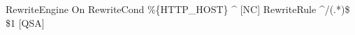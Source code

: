 \begin{ospcode}
RewriteEngine On
RewriteCond \%\{HTTP_HOST\} ^ [NC]
RewriteRule ^/(.*)\$ \$1 [QSA]
\end{ospcode}
